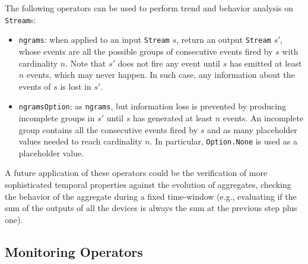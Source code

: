 The following operators can be used to perform trend and behavior analysis on
\texttt{Stream}s:

\begin{itemize}
  \item \texttt{ngrams}: when applied to an input \texttt{Stream} $s$, return
        an output \texttt{Stream} $s'$, whose events are all the possible
        groups of consecutive events fired by $s$ with cardinality $n$. Note
        that $s'$ does not fire any event until $s$ has emitted at least $n$
        events, which may never happen. In such case, any information about the
        events of $s$ is lost in $s'$.
  \item \texttt{ngramsOption}: as \texttt{ngrams}, but information loss is
        prevented by producing incomplete groups in $s'$ until $s$ has
        generated at least $n$ events. An incomplete group contains all the
        consecutive events fired by $s$ and as many placeholder values needed
        to reach cardinality $n$. In particular, \texttt{Option.None} is used
        as a placeholder value.
\end{itemize}

A future application of these operators could be the verification of more
sophisticated temporal properties against the evolution of aggregates, checking
the behavior of the aggregate during a fixed time-window (e.g., evaluating if
the sum of the outputs of all the devices is always the sum at the previous
step plus one).

\subsection{Monitoring Operators}

